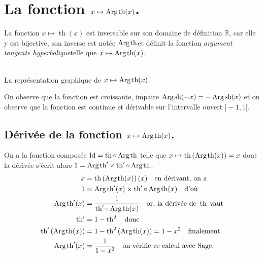 \documentclass[a4paper,12pt]{report}
\def\eclaire{\mathbb}
\def\R{\ensuremath{\eclaire R}}
\def\Id{\ensuremath{\mathrm{Id}}}
\renewcommand{\sinh}{\mathop{\mathrm{sh}}}
\renewcommand{\tanh}{\mathop{\mathrm{th}}}
\renewcommand{\arg}{\mathop{\mathrm{Arg}}}
\begin{document}
\section{La fonction  $x \mapsto \arg\mspace{-1mu}\tanh(x)$.}

La fonction $x \mapsto \tanh(x)$ est inversable sur son domaine de définition $\R$, car elle y est bijective, son inverse est notée \og$ \arg\mspace{-1mu}\tanh $\fg et définit la fonction \og\emph{argument tangente hyperbolique}\fg telle que $x \mapsto \arg\mspace{-1mu}\tanh(x)$.


\begin{center}
 \\
La représentation graphique de $x \mapsto \arg\mspace{-1mu}\tanh(x)$.
\end{center}
On observe que la fonction est croissante, impaire $\arg\mspace{-1mu}\sinh(-x) = -\arg\mspace{-1mu}\sinh(x) $
et on observe que la fonction est continue et dérivable sur l'intervalle ouvert $]-1,1[$.                                                                                                             

\subsection{Dérivée de la fonction $x \mapsto \arg\mspace{-1mu}\tanh(x)$.}
On a la fonction composée $\Id = \tanh \circ \arg\mspace{-1mu}\tanh$ telle que $x\mapsto\tanh\left(\arg\mspace{-1mu}\tanh(x)\right)=x$ dont la dérivée s'écrit alors $1= \arg\mspace{-1mu}\tanh\nolimits' \times \tanh\nolimits'\circ\arg\mspace{-1mu}\tanh$.
\begin{align*}
x & =\tanh\left(\arg\mspace{-1mu}\tanh(x)\right)(x) \quad \textrm{en dérivant, on a}\\
1 & = \arg\mspace{-1mu}\tanh\nolimits'(x) \times \tanh\nolimits'\circ\arg\mspace{-1mu}\tanh(x) \quad \textrm{d'où}\\
\arg\mspace{-1mu}\tanh\nolimits'(x) & =\frac{1}{ \tanh\nolimits'\circ\arg\mspace{-1mu}\tanh(x)}\quad \textrm{or, la dérivée de } \tanh \; \textrm{vaut}\\
\tanh\nolimits' & = 1-\tanh\nolimits^2 \quad \textrm{donc} \\
\tanh\nolimits'\left(\arg\mspace{-1mu}\tanh(x)\right) & = 1 - \tanh\nolimits^2 \left(\arg\mspace{-1mu}\tanh(x)\right) = 1 - x^2 \quad \textrm{finalement}\\
\arg\mspace{-1mu}\tanh\nolimits'(x) & = \frac{1}{ 1- x^2} \quad \textrm{on vérifie ce calcul avec Sage.}
\end{align*}
\end{document}
